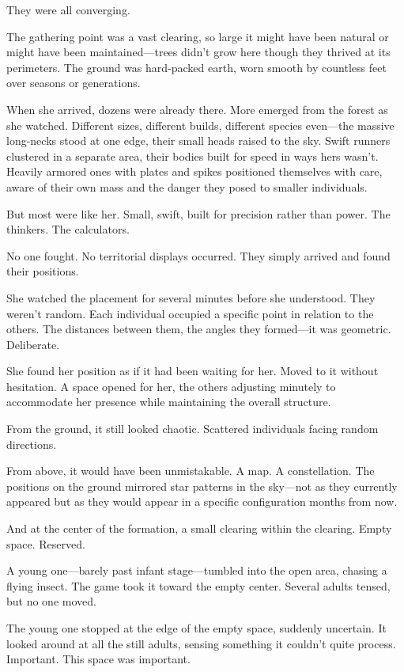 They were all converging.

The gathering point was a vast clearing, so large it might have been natural or might have been maintained—trees didn't grow here though they thrived at its perimeters. The ground was hard-packed earth, worn smooth by countless feet over seasons or generations.

When she arrived, dozens were already there. More emerged from the forest as she watched. Different sizes, different builds, different species even—the massive long-necks stood at one edge, their small heads raised to the sky. Swift runners clustered in a separate area, their bodies built for speed in ways hers wasn't. Heavily armored ones with plates and spikes positioned themselves with care, aware of their own mass and the danger they posed to smaller individuals.

But most were like her. Small, swift, built for precision rather than power. The thinkers. The calculators.

No one fought. No territorial displays occurred. They simply arrived and found their positions.

She watched the placement for several minutes before she understood. They weren't random. Each individual occupied a specific point in relation to the others. The distances between them, the angles they formed—it was geometric. Deliberate.

She found her position as if it had been waiting for her. Moved to it without hesitation. A space opened for her, the others adjusting minutely to accommodate her presence while maintaining the overall structure.

From the ground, it still looked chaotic. Scattered individuals facing random directions.

From above, it would have been unmistakable. A map. A constellation. The positions on the ground mirrored star patterns in the sky—not as they currently appeared but as they would appear in a specific configuration months from now.

And at the center of the formation, a small clearing within the clearing. Empty space. Reserved.

A young one—barely past infant stage—tumbled into the open area, chasing a flying insect. The game took it toward the empty center. Several adults tensed, but no one moved.

The young one stopped at the edge of the empty space, suddenly uncertain. It looked around at all the still adults, sensing something it couldn't quite process. Important. This space was important.


